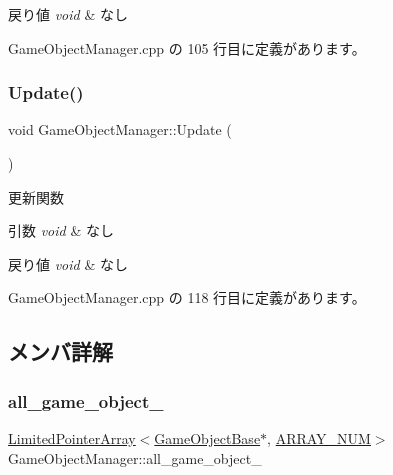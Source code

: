 \begin{DoxyRetVals}{戻り値}
{\em void} & なし \\
\hline
\end{DoxyRetVals}


 Game\+Object\+Manager.\+cpp の 105 行目に定義があります。

\mbox{\label{class_game_object_manager_a6f053b1c655de6ca1c9a8fa9b6e118ae}} 
\subsubsection{\texorpdfstring{Update()}{Update()}}
{\footnotesize\ttfamily void Game\+Object\+Manager\+::\+Update (\begin{DoxyParamCaption}{ }\end{DoxyParamCaption})}



更新関数 


\begin{DoxyParams}{引数}
{\em void} & なし \\
\hline
\end{DoxyParams}

\begin{DoxyRetVals}{戻り値}
{\em void} & なし \\
\hline
\end{DoxyRetVals}


 Game\+Object\+Manager.\+cpp の 118 行目に定義があります。



\subsection{メンバ詳解}
\mbox{\label{class_game_object_manager_a6bde8822fae64e488627addb70c32182}} 
\subsubsection{\texorpdfstring{all\+\_\+game\+\_\+object\+\_\+}{all\_game\_object\_}}
{\footnotesize\ttfamily \mbox{\hyperlink{class_limited_pointer_array}{Limited\+Pointer\+Array}}$<$\mbox{\hyperlink{class_game_object_base}{Game\+Object\+Base}}$\ast$, \mbox{\hyperlink{class_game_object_manager_a591934d64d750c10c03c908371470681}{A\+R\+R\+A\+Y\+\_\+\+N\+UM}}$>$ Game\+Object\+Manager\+::all\+\_\+game\+\_\+object\+\_\+\hspace{0.3cm}{\ttfamily [private]}}



